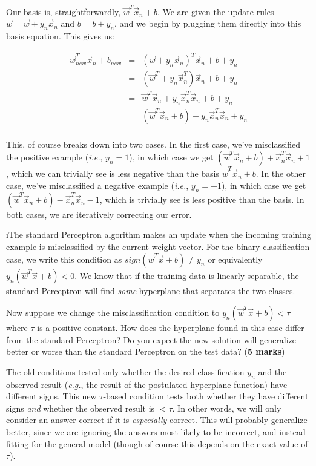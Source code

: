 \documentclass[fleqn]{article}
\begin{document}
\begin{solution}
Our basis is, straightforwardly, $\vec{w}^T\vec{x}_n + b$. We are given the update rules $\vec{w} = \vec{w} + y_n\vec{x}_n$ and $b = b + y_n$, and we begin by plugging them directly into this basis equation. This gives us:

\begin{eqnarray*}
\vec{w}^T_{new}\vec{x}_n + b_{new} & = & (\vec{w} + y_n\vec{x}_n)^T \vec{x}_n + b + y_n \\
& = & (\vec{w}^T + y_n\vec{x}^T_n)\vec{x}_n + b + y_n \\
& = & \vec{w}^T\vec{x}_n + y_n\vec{x}^T_n\vec{x}_n + b + y_n \\
& = & (\vec{w}^T\vec{x}_n + b) + y_n\vec{x}^T_n\vec{x}_n + y_n \\
\end{eqnarray*}

This, of course breaks down into two cases. In the first case, we've misclassified the positive example (\textit{i.e.}, $y_n = 1$), in which case we get $(\vec{w}^T\vec{x}_n + b) + \vec{x}^T_n\vec{x}_n + 1$, which we can trivially see is less negative than the basis $\vec{w}^T\vec{x}_n + b$. In the other case, we've misclassified a negative example (\textit{i.e.}, $y_n = -1$), in which case we get $(\vec{w}^T\vec{x}_n + b) - \vec{x}^T_n\vec{x}_n - 1$, which is trivially see is less positive than the basis. In both cases, we are iteratively correcting our error.

\end{solution}

\i The standard Perceptron algorithm makes an update when the incoming training example
is misclassified by the current weight vector. For the binary classification
case, we write this condition as $sign(\vec{w}^T\vec{x}+b) \neq y_n$ 
or equivalently $y_n(\vec{w}^T\vec{x}+b) < 0$. We know that if the training data
is linearly separable, the standard Perceptron will find \textit{some} hyperplane
that separates the two classes.

Now suppose we change the misclassification condition to $y_n(\vec{w}^T\vec{x}+b) 
<  \tau$ where $\tau$ is a positive constant. How does the hyperplane found
in this case differ from the standard Perceptron? Do you expect the 
new solution will generalize better or worse than the standard Perceptron on the 
test data? (\textbf{5 marks})

\begin{solution}
The old conditions tested only whether the desired classification $y_n$ and the observed result (\textit{e.g.}, the result of the postulated-hyperplane function) have different signs. This new $\tau$-based condition tests both whether they have different signs \textit{and} whether the observed result is $< \tau$. In other words, we will only consider an answer correct if it is \textit{especially} correct. This will probably generalize better, since we are ignoring the answers most likely to be incorrect, and instead fitting for the general model (though of course this depends on the exact value of $\tau$).
\end{solution}
\end{document}
